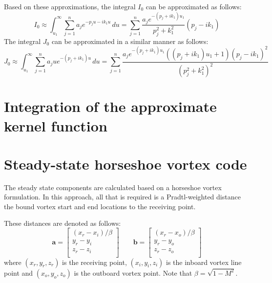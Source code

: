 \documentclass[12pt]{article}
\newcommand{\f}{\frac}
\newcommand{\mb}{\mathbf}
\begin{document}
Based on these approximations, the integral $I_{0}$ can be
approximated as follows:
%
\begin{equation*}
  I_{0} \approx \int_{u_{1}}^{\infty} \sum_{j=1}^{n} a_{j} e^{-p_{j}u - ik_{1}u} \, du 
  = \sum_{j=1}^{n} \f{a_{j}e^{-(p_{j} + i k_{1})u_{1}}}{p_{j}^2 + k_{1}^2} (p_{j} - i k_1)
\end{equation*}
%
The integral $J_{0}$ can be approximated in a similar manner as
follows:
%
\begin{equation*}
  J_{0} \approx \int_{u_{1}}^{\infty} \sum_{j=1}^{n} a_{j} u e^{-(p_{j} + ik_{1})u} \, du 
  = \sum_{j=1}^{n} \f{a_{j}e^{-(p_{j} + i k_{1})u_{1}}((p_{j} + i k_1)u_{1} + 1)(p_{j} - ik_{1})^2}{(p_{j}^2 + k_{1}^2)^2}
\end{equation*}

\section{Integration of the approximate kernel function}



\section{Steady-state horseshoe vortex code}

The steady state components are calculated based on a horseshoe vortex
formulation. In this approach, all that is required is a
Pradtl-weighted distance the bound vortex start and end locations to
the receiving point. 

These distances are denoted as follows:
%
\begin{equation*}
  \mb{a} = \begin{bmatrix} 
    (x_{r} - x_{i})/\beta \\
    y_r - y_i \\
    z_r - z_i \\
  \end{bmatrix}
  \qquad
  \mb{b} = \begin{bmatrix} 
    (x_{r} - x_{o})/\beta \\
    y_r - y_o \\
    z_r - z_o \\
  \end{bmatrix}
\end{equation*}
%
where $(x_r, y_r, z_r)$ is the receiving point, $(x_{i}, y_{i},
z_{i})$ is the inboard vortex line point and $(x_{o}, y_{o}, z_{o})$
is the outboard vortex point. Note that $\beta = \sqrt{1 - M^2}$.
\end{document}
